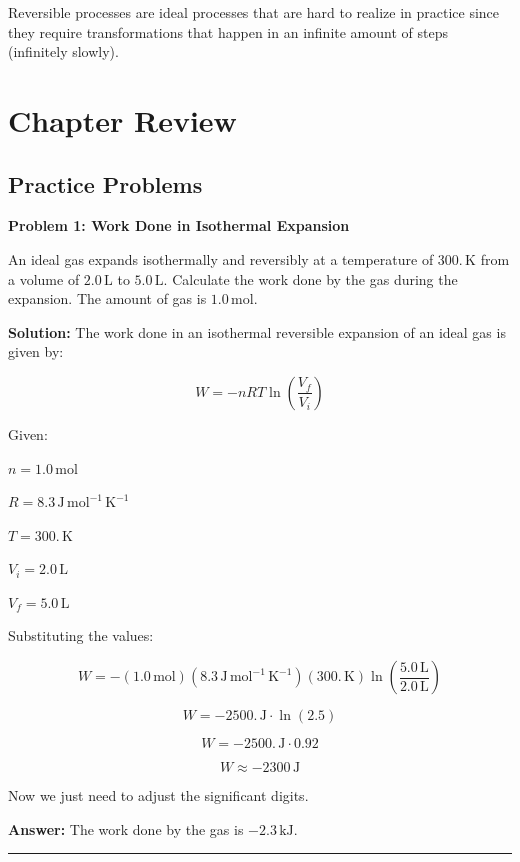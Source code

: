 \documentclass[
  9pt,
]{extbook}
\theoremstyle{definition}
\theoremstyle{definition}
\theoremstyle{definition}
\theoremstyle{remark}
\begin{document}
Reversible processes are ideal processes that are hard to realize in practice since they require transformations that happen in an infinite amount of steps (infinitely slowly).

\hypertarget{rev3}{%
\section{Chapter Review}\label{rev3}}

\hypertarget{exer3}{%
\subsection{Practice Problems}\label{exer3}}

\textbf{Problem 1: Work Done in Isothermal Expansion}

An ideal gas expands isothermally and reversibly at a temperature of \(300. \, \text{K}\) from a volume of \(2.0 \, \text{L}\) to \(5.0 \, \text{L}\). Calculate the work done by the gas during the expansion. The amount of gas is \(1.0 \, \text{mol}\).

\textbf{Solution:} The work done in an isothermal reversible expansion of an ideal gas is given by:

\[ W = -nRT \ln \left(\frac{V_f}{V_i}\right) \]

Given:

\(n = 1.0 \, \text{mol}\)

\(R = 8.3 \, \text{J} \, \text{mol}^{-1} \, \text{K}^{-1}\)

\(T = 300. \, \text{K}\)

\(V_i = 2.0 \, \text{L}\)

\(V_f = 5.0 \, \text{L}\)

Substituting the values:

\[ W = - (1.0\, \text{mol}) (8.3 \, \text{J} \, \text{mol}^{-1} \, \text{K}^{-1}) (300. \, \text{K})  \ln \left(\frac{5.0\, \text{L}}{2.0\, \text{L}}\right) \]

\[ W = -2500.\, \text{J} \cdot \ln \left(2.5\right) \]

\[ W = -2500.\, \text{J} \cdot 0.92 \]

\[ W \approx -2300 \, \text{J} \]

Now we just need to adjust the significant digits.

\textbf{Answer:} The work done by the gas is \(-2.3 \, \text{kJ}\).

\begin{center}\rule{0.5\linewidth}{0.5pt}\end{center}
\end{document}

